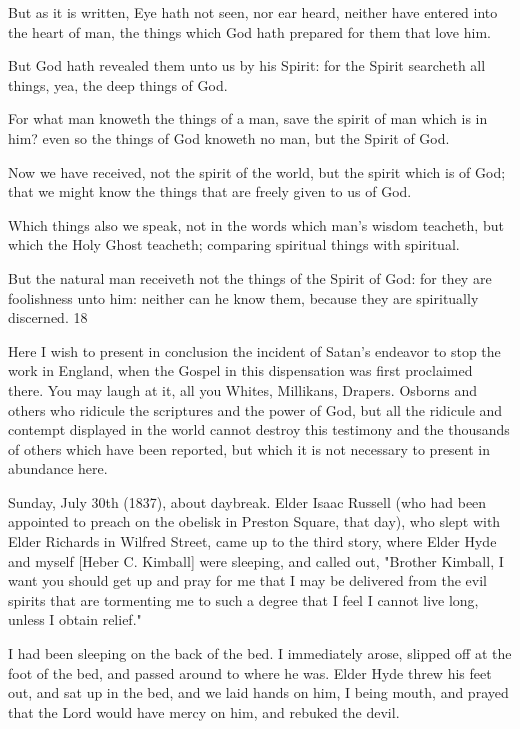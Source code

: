 But as it is written, Eye hath not seen, nor ear heard, neither have entered into the heart of
man, the things which God hath prepared for them that love him.

But God hath revealed them unto us by his Spirit: for the Spirit searcheth all things, yea, the
deep things of God.

For what man knoweth the things of a man, save the spirit of man which is in him? even so
the things of God knoweth no man, but the Spirit of God.

Now we have received, not the spirit of the world, but the spirit which is of God; that we
might know the things that are freely given to us of God.

Which things also we speak, not in the words which man's wisdom teacheth, but which the
Holy Ghost teacheth; comparing spiritual things with spiritual.

But the natural man receiveth not the things of the Spirit of God: for they are foolishness
unto him: neither can he know them, because they are spiritually discerned. 18

Here I wish to present in conclusion the incident of Satan's endeavor to stop the work in
England, when the Gospel in this dispensation was first proclaimed there. You may laugh at
it, all you Whites, Millikans, Drapers. Osborns and others who ridicule the scriptures and the
power of God, but all the ridicule and contempt displayed in the world cannot destroy this
testimony and the thousands of others which have been reported, but which it is not
necessary to present in abundance here.

Sunday, July 30th (1837), about daybreak. Elder Isaac Russell (who had been appointed to
preach on the obelisk in Preston Square, that day), who slept with Elder Richards in Wilfred
Street, came up to the third story, where Elder Hyde and myself [Heber C. Kimball] were
sleeping, and called out, "Brother Kimball, I want you should get up and pray for me that I
may be delivered from the evil spirits that are tormenting me to such a degree that I feel I
cannot live long, unless I obtain relief."

I had been sleeping on the back of the bed. I immediately arose, slipped off at the foot of the
bed, and passed around to where he was. Elder Hyde threw his feet out, and sat up in the bed,
and we laid hands on him, I being mouth, and prayed that the Lord would have mercy on
him, and rebuked the devil.

